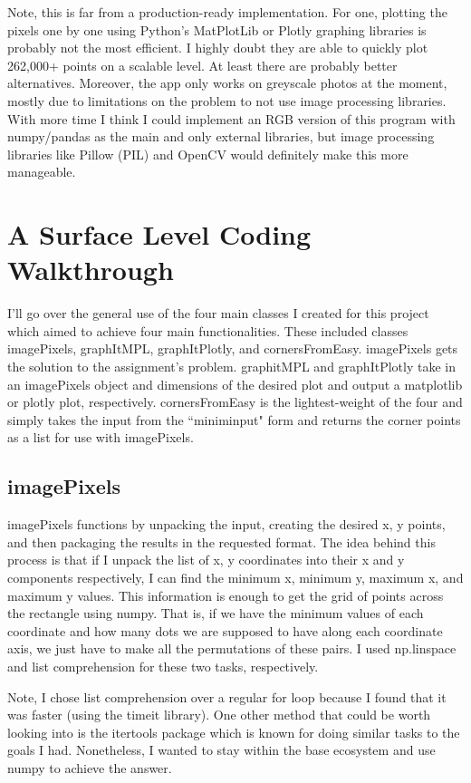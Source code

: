 \documentclass[10pt]{article}
\begin{document}
\begin{multicols*}{2}
Note, this is far from a production-ready implementation. For one, plotting the pixels one by one using Python's MatPlotLib or Plotly graphing libraries is probably not the most efficient. I highly doubt they are able to quickly plot 262,000+ points on a scalable level. At least there are probably better alternatives. Moreover, the app only works on greyscale photos at the moment, mostly due to limitations on the problem to not use image processing libraries. With more time I think I could implement an RGB version of this program with numpy/pandas as the main and only external libraries, but image processing libraries like Pillow (PIL) and OpenCV would definitely make this more manageable.

\section{A Surface Level Coding Walkthrough}

I'll go over the general use of the four main classes I created for this project which aimed to achieve four main functionalities. These included classes imagePixels, graphItMPL, graphItPlotly, and cornersFromEasy. imagePixels gets the solution to the assignment's problem. graphitMPL and graphItPlotly take in an imagePixels object and dimensions of the desired plot and output a matplotlib or plotly plot, respectively. cornersFromEasy is the lightest-weight of the four and simply takes the input from the ``miniminput" form and returns the corner points as a list for use with imagePixels.

\subsection{imagePixels}

imagePixels functions by unpacking the input, creating the desired x, y points, and then packaging the results in the requested format. The idea behind this process is that if I unpack the list of x, y coordinates into their x and y components respectively, I can find the minimum x, minimum y, maximum x, and maximum y values. This information is enough to get the grid of points across the rectangle using numpy. That is, if we have the minimum values of each coordinate and how many dots we are supposed to have along each coordinate axis, we just have to make all the permutations of these pairs. I used np.linspace and list comprehension for these two tasks, respectively.

Note, I chose list comprehension over a regular for loop because I found that it was faster (using the timeit library). One other method that could be worth looking into is the itertools package which is known for doing similar tasks to the goals I had. Nonetheless, I wanted to stay within the base ecosystem and use numpy to achieve the answer.


\end{multicols*}
\end{document}
